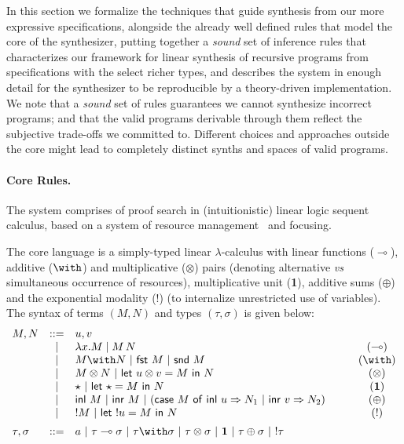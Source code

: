 \documentclass{llncs}
\newcommand{\lolli}{\multimap}
\newcommand{\tensor}{\otimes}
\newcommand{\one}{\mathbf{1}}
\newcommand{\bang}{{!}}
\newcommand{\mypara}[1]{\paragraph{\textbf{#1}.}}
\newcommand{\llet}[2]{\mathsf{let}\ #1\ \mathsf{in}\ #2}
\begin{document}
In this section we formalize  the techniques that guide
synthesis from our more expressive specifications, alongside the already well
defined rules that model the core of the synthesizer, putting together a
\emph{sound} set of inference rules that characterizes our framework
for linear synthesis of
recursive programs from specifications with the select richer types,
and describes the system in enough detail for the synthesizer to be reproducible
by a theory-driven implementation.
%
We note that a \emph{sound} set of rules guarantees we cannot synthesize
incorrect programs; and that the valid programs derivable through them
reflect the subjective trade-offs we committed to. Different
choices and approaches outside the core might lead to completely
distinct synths and spaces of valid programs.


\mypara{Core Rules} The system comprises of proof search in
(intuitionistic) linear logic sequent calculus, based on a system of
resource management~\cite{DBLP:journals/tcs/CervesatoHP00,DBLP:journals/tcs/LiangM09}
and focusing.

The core language is a simply-typed linear $\lambda$-calculus with linear
functions ($\lolli$), additive ($\with$) and multiplicative
($\tensor$) pairs
(denoting alternative \emph{vs} simultaneous occurrence of resources),
multiplicative unit (\textbf{1}), additive sums ($\oplus$)
and the exponential modality ($\bang$) (to internalize unrestricted
use of variables). The syntax of terms $(M,N)$ and types $(\tau, \sigma)$ is given below:
\[
  \begin{array}{lclcc}
    M,N & ::= & u, v & \quad & \\
        & \mid & \lambda x.M \mid M\, N & & (\lolli) \\
        & \mid & M \with N\ \vert\ \mathsf{fst}\ M\ \vert\
                 \mathsf{snd}\ M && (\with) \\
        & \mid & M \tensor N\ \vert\ \llet{u\tensor v = M}{N} && (\tensor)\\
        & \mid & \star\ \vert\ \llet{\star = M}{N} && (\one) \\
        & \mid & \mathsf{inl}\ M\ \vert\ \mathsf{inr}\ M\ \vert\ (\mathsf{case}\
    M\ \mathsf{of\ inl}\ u \Rightarrow N_1\ \vert\ \mathsf{inr}\ v \Rightarrow
                 N_2) && (\oplus)\\
        & \mid & \bang M\ \vert\ \llet{\bang u = M}{N} && (\bang)\\[0,5em]
    \tau, \sigma & ::= & a\ \vert\ \tau \lolli \sigma\ \vert\ \tau \with \sigma\
    \vert\ \tau \tensor \sigma\ \vert\ \mathbf{1}\ \vert\ \tau \oplus \sigma\ \vert\ \bang \tau
  \end{array}
\]
\end{document}
